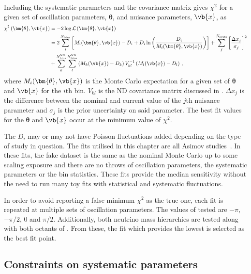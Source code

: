 Including the systematic parameters and the covariance matrix gives $\chi^{2}$ for a given set of oscillation parameters, $\bm{\theta}$, and nuisance parameters, $\vb{x}$, as
\begin{align}
	\chi^{2} \left( \bm{\theta}, \vb{x} \right) &= -2 \log \mathcal{L} \left( \bm{\theta}, \vb{x} \right) \\
	&= 2 \sum_{i}^{N_{\text{bins}}} \left[ M_{i} (\bm{\theta}, \vb{x}) - D_{i} + D_{i} \ln \left( \frac{D_{i}}{M_{i}(\bm{\theta}, \vb{x})} \right) \right] + \sum_{j}^{N_{\text{systs}}} \left[ \frac{\Delta x_{j}}{\sigma_{j}} \right]^{2} \nonumber \\
	&+ \sum_{k}^{N^{\text{ND}}_{\text{bins}}} \sum_{l}^{ N_{\text{bins}}^{\text{ND}} } \left(  M_{k} (\vb{x}) - D_{k} \right) V_{kl}^{-1} \left( M_{l}(\vb{x}) - D_{l} \right) \, ,
\end{align}
where $M_{i}(\bm{\theta}, \vb{x})$ is the Monte Carlo expectation for a given set of $\bm{\theta}$ and $\vb{x}$ for the $i$th bin. 
$V_{kl}$ is the ND covariance matrix discussed in .
$\Delta x_{j}$ is the difference between the nominal and current value of the $j$th nuisance parameter and $\sigma_{j}$ is the prior uncertainty on said parameter.
The best fit values for the $\bm{\theta}$ and $\vb{x}$ occur at the minimum value of $\chi^{2}$.

The $D_{i}$ may or may not have Poisson fluctuations added depending on the type of study in question.
The fits utilised in this chapter are all Asimov studies~\cite{asimov}.
In these fits, the fake dataset is the same as the nominal Monte Carlo up to some scaling exposure and there are no throws of oscillation parameters, the systematic parameters or the bin statistics.
These fits provide the median sensitivity without the need to run many toy fits with statistical and systematic fluctuations.

In order to avoid reporting a false minimum $\chi^{2}$ as the true one, each fit is repeated at multiple sets of oscillation parameters. 
The values of \dcp tested are $-\pi$, $-\pi/2$, 0 and $\pi/2$. 
Additionally, both neutrino mass hierarchies are tested along with both octants of .
From these, the fit which provides the lowest \chisquare is selected as the best fit point.

\subsection{Constraints on systematic parameters}

